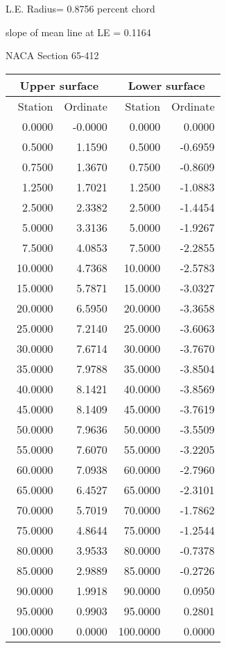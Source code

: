 \documentclass[11pt]{book}
\begin{document}
L.E. Radius=  0.8756 percent chord


 slope of mean line at LE =  0.1164
 \newpage
  \label{s65-412}
 \begin{Large}
 NACA Section 65-412
 \end{Large}
  
 \vspace{8mm}
 \begin{tabular}{|r|r|r|r|} \hline 
 \multicolumn{2}{|c|}{Upper surface} & \multicolumn{2}{|c|}{Lower surface} \\
 \hline
 Station & Ordinate & Station & Ordinate \\
 \hline
0.0000 & -0.0000 & 0.0000 & 0.0000 \\
0.5000 & 1.1590 & 0.5000 & -0.6959 \\
0.7500 & 1.3670 & 0.7500 & -0.8609 \\
1.2500 & 1.7021 & 1.2500 & -1.0883 \\
2.5000 & 2.3382 & 2.5000 & -1.4454 \\
5.0000 & 3.3136 & 5.0000 & -1.9267 \\
7.5000 & 4.0853 & 7.5000 & -2.2855 \\
10.0000 & 4.7368 & 10.0000 & -2.5783 \\
15.0000 & 5.7871 & 15.0000 & -3.0327 \\
20.0000 & 6.5950 & 20.0000 & -3.3658 \\
25.0000 & 7.2140 & 25.0000 & -3.6063 \\
30.0000 & 7.6714 & 30.0000 & -3.7670 \\
35.0000 & 7.9788 & 35.0000 & -3.8504 \\
40.0000 & 8.1421 & 40.0000 & -3.8569 \\
45.0000 & 8.1409 & 45.0000 & -3.7619 \\
50.0000 & 7.9636 & 50.0000 & -3.5509 \\
55.0000 & 7.6070 & 55.0000 & -3.2205 \\
60.0000 & 7.0938 & 60.0000 & -2.7960 \\
65.0000 & 6.4527 & 65.0000 & -2.3101 \\
70.0000 & 5.7019 & 70.0000 & -1.7862 \\
75.0000 & 4.8644 & 75.0000 & -1.2544 \\
80.0000 & 3.9533 & 80.0000 & -0.7378 \\
85.0000 & 2.9889 & 85.0000 & -0.2726 \\
90.0000 & 1.9918 & 90.0000 & 0.0950 \\
95.0000 & 0.9903 & 95.0000 & 0.2801 \\
100.0000 & 0.0000 & 100.0000 & 0.0000 \\
 \hline 
 \end{tabular}
\end{document}
